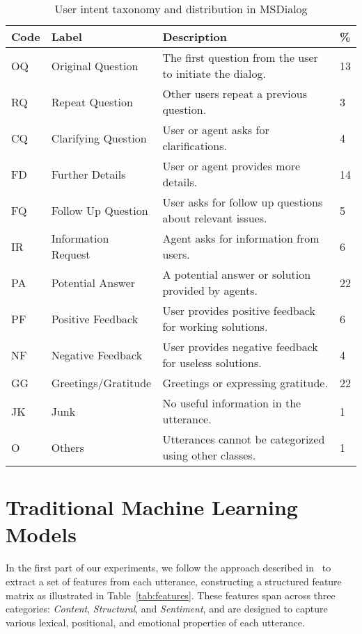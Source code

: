 \documentclass{article}
\begin{document}
\begin{table}[H]
\centering
\caption{User intent taxonomy and distribution in MSDialog}
\label{tab:taxonomy}
\begin{tabular}{llll}
\hline
\textbf{Code} & \textbf{Label} & \textbf{Description} & \textbf{\%} \\
\hline
OQ & Original Question & The first question from the user to initiate the dialog. & 13 \\
RQ & Repeat Question & Other users repeat a previous question. & 3 \\
CQ & Clarifying Question & User or agent asks for clarifications. & 4 \\
FD & Further Details & User or agent provides more details. & 14 \\
FQ & Follow Up Question & User asks for follow up questions about relevant issues. & 5 \\
IR & Information Request & Agent asks for information from users. & 6 \\
PA & Potential Answer & A potential answer or solution provided by agents. & 22 \\
PF & Positive Feedback & User provides positive feedback for working solutions. & 6 \\
NF & Negative Feedback & User provides negative feedback for useless solutions. & 4 \\
GG & Greetings/Gratitude & Greetings or expressing gratitude. & 22 \\
JK & Junk & No useful information in the utterance. & 1 \\
O & Others & Utterances cannot be categorized using other classes. & 1 \\
\hline
\end{tabular}
\end{table}

\section{Traditional Machine Learning Models}

In the first part of our experiments, we follow the approach described in~\cite{qu2019user} to extract a set of features from each utterance, constructing a structured feature matrix as illustrated in Table~\ref{tab:features}. These features span across three categories: \textit{Content}, \textit{Structural}, and \textit{Sentiment}, and are designed to capture various lexical, positional, and emotional properties of each utterance.
\end{document}
